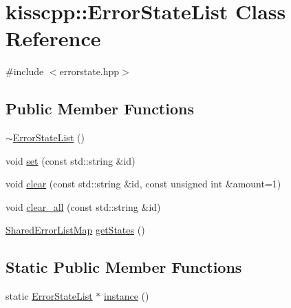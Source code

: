 \hypertarget{classkisscpp_1_1_error_state_list}{\section{kisscpp\-:\-:Error\-State\-List Class Reference}
\label{classkisscpp_1_1_error_state_list}
}


{\ttfamily \#include $<$errorstate.\-hpp$>$}

\subsection*{Public Member Functions}
\begin{DoxyCompactItemize}
\item 
\hyperlink{classkisscpp_1_1_error_state_list_a0c53a01c63906189fad454dd5e217181}{$\sim$\-Error\-State\-List} ()
\item 
void \hyperlink{classkisscpp_1_1_error_state_list_ae3998a49baee5f0aa709dbd6bb9e0397}{set} (const std\-::string \&id)
\item 
void \hyperlink{classkisscpp_1_1_error_state_list_a848953f011b5acc35538bb82f35ef67f}{clear} (const std\-::string \&id, const unsigned int \&amount=1)
\item 
void \hyperlink{classkisscpp_1_1_error_state_list_a4cf6d39a68e8dbbae8111ea383aaf14a}{clear\-\_\-all} (const std\-::string \&id)
\item 
\hyperlink{namespacekisscpp_a52b7a11959a119c1da931042d7751db0}{Shared\-Error\-List\-Map} \hyperlink{classkisscpp_1_1_error_state_list_af51ba7384104a15f7809f62da9c5447d}{get\-States} ()
\end{DoxyCompactItemize}
\subsection*{Static Public Member Functions}
\begin{DoxyCompactItemize}
\item 
static \hyperlink{classkisscpp_1_1_error_state_list}{Error\-State\-List} $\ast$ \hyperlink{classkisscpp_1_1_error_state_list_a20309374dc63ffee8aebeb986340dfba}{instance} ()
\end{DoxyCompactItemize}


